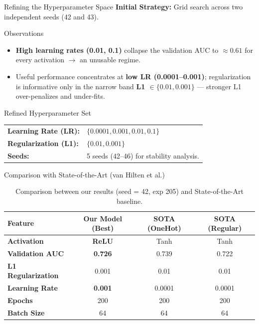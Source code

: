 \documentclass[aspectratio=169]{beamer}
\begin{document}
\begin{frame}{Refining the Hyperparameter Space}
	\small
	\textbf{Initial Strategy:} Grid search across two independent seeds (42 and 43).

	\vspace{0.2cm}

	\begin{block}{Observations}
		\begin{itemize}
			\item \textbf{High learning rates (0.01, 0.1)} collapse the validation AUC to $\approx 0.61$ for every activation $\rightarrow$ an unusable regime.
			\item Useful performance concentrates at \textbf{low LR (0.0001--0.001)}; regularization is informative only in the narrow band \textbf{L1 $\in\{0.01, 0.001\}$} --- stronger L1 over-penalizes and under-fits.
		\end{itemize}
	\end{block}

	\vspace{0.2cm}

	\begin{block}{Refined Hyperparameter Set}
		\centering
		\scriptsize
		\begin{tabular}{l l}
			\textbf{Learning Rate (LR):} & $\{0.0001, 0.001, 0.01, 0.1\}$ \\
			\textbf{Regularization (L1):} & $\{0.01, 0.001\}$ \\
			\textbf{Seeds:} & 5 seeds (42--46) for stability analysis.
		\end{tabular}
	\end{block}
\end{frame}

\begin{frame}{Comparison with State-of-the-Art (van Hilten et al.)}
	\begin{table}
		\centering
		\scriptsize
		\renewcommand{\arraystretch}{1.4}
		\begin{tabular}{l | c | c c}
			\hline
			\textbf{Feature} & \textbf{Our Model (Best)} & \textbf{SOTA (OneHot)} & \textbf{SOTA (Regular)} \\
			\hline
			\textbf{Activation} & \textbf{ReLU} & Tanh & Tanh \\
			\textbf{Validation AUC} & \textbf{0.726} & 0.739 & 0.722 \\
			\textbf{L1 Regularization} & 0.001 & 0.01 & 0.01 \\
			\textbf{Learning Rate} & \textbf{0.001} & 0.0001 & 0.0001 \\
			\textbf{Epochs} & 200 & 200 & 200 \\
			\textbf{Batch Size} & 64 & 64 & 64 \\
			\hline
		\end{tabular}
		\caption{Comparison between our results (seed = 42, exp 205) and State-of-the-Art baseline.}
	\end{table}
\end{frame}
\end{document}
